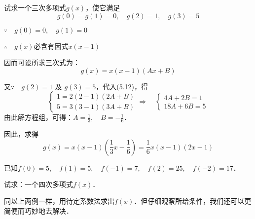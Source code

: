 \begin{example}
试求一个三次多项式$g(x)$，使它满足
\[g (0) =g (1) =0,\quad g (2) =1,\quad g (3) =5\]
\end{example}

\begin{solution}
    $\because\quad g(0)=0,\quad g(1)=0$

$\therefore\quad g(x)$必含有因式$x(x-1)$

因而可设所求三次式为：
\begin{equation}
    g (x) =x (x-1) (Ax+B)
\end{equation}

又$\because\quad g(2)=1$ 及 $g(3)=5$，代入(5.12)，得 
\[\begin{cases}
    1=2(2-1)(2A+B)\\
    5=3(3-1)(3A+B)
\end{cases}\Rightarrow\quad \begin{cases}
    4A+2B=1\\
    18A+6B=5
\end{cases}\]
由此解方程组，可得：$A=\frac{1}{3},\quad B=-\frac{1}{6}$．

因此，求得
\[g(x)=x(x-1)\left(\frac{1}{3}x-\frac{1}{6}\right)=\frac{1}{6}x(x-1)(2x-1)\]
\end{solution}

\begin{example}
已知$f(0)=5,\quad f(1)=5,\quad f(-1)=7,\quad f(2)=25,\quad f(-2)=17$．

试求：一个四次多项式$f (x)$．
\end{example}

\begin{note}
同以上两例一样，用待定系数法求出$f(x)$．但仔细观察所给条件，我们还可以更简便而巧妙地去解决．
\end{note}


